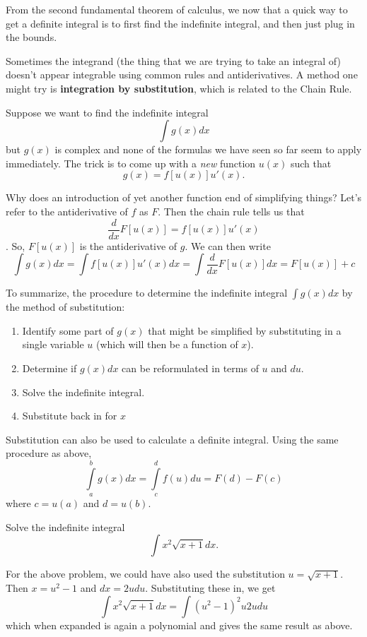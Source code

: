 \documentclass[]{book}
\providecommand{\tightlist}{%
  \setlength{\itemsep}{0pt}\setlength{\parskip}{0pt}}
\theoremstyle{definition}
\theoremstyle{definition}
\theoremstyle{definition}
\theoremstyle{remark}
\let\BeginKnitrBlock\begin \let\EndKnitrBlock\end
\begin{document}
From the second fundamental theorem of calculus, we now that a quick way
to get a definite integral is to first find the indefinite integral, and
then just plug in the bounds.

Sometimes the integrand (the thing that we are trying to take an
integral of) doesn't appear integrable using common rules and
antiderivatives. A method one might try is \textbf{integration by
substitution}, which is related to the Chain Rule.

Suppose we want to find the indefinite integral \[\int g(x)dx\] but
\(g(x)\) is complex and none of the formulas we have seen so far seem to
apply immediately. The trick is to come up with a \emph{new} function
\(u(x)\) such that \[g(x)=f[u(x)]u'(x).\]

Why does an introduction of yet another function end of simplifying
things? Let's refer to the antiderivative of \(f\) as \(F\). Then the
chain rule tells us that \[\frac{d}{dx} F[u(x)]=f[u(x)]u'(x)\]. So,
\(F[u(x)]\) is the antiderivative of \(g\). We can then write
\[\int g(x) dx= \int f[u(x)]u'(x)dx = \int \frac{d}{dx} F[u(x)]dx = F[u(x)]+c\]

To summarize, the procedure to determine the indefinite integral
\(\int g(x)dx\) by the method of substitution:

\begin{enumerate}
\def\labelenumi{\arabic{enumi}.}
\tightlist
\item
  Identify some part of \(g(x)\) that might be simplified by
  substituting in a single variable \(u\) (which will then be a function
  of \(x\)).
\item
  Determine if \(g(x)dx\) can be reformulated in terms of \(u\) and
  \(du\).
\item
  Solve the indefinite integral.
\item
  Substitute back in for \(x\)
\end{enumerate}

Substitution can also be used to calculate a definite integral. Using
the same procedure as above,
\[\int\limits_a^b g(x)dx=\int\limits_c^d f(u)du = F(d)-F(c)\] where
\(c=u(a)\) and \(d=u(b)\).

\BeginKnitrBlock{example}[Integration by Substitution I]
\protect\hypertarget{exm:intsub1}{}{\label{exm:intsub1}
{} } Solve the indefinite
integral \[\int x^2 \sqrt{x+1}dx.\]
\EndKnitrBlock{example}

For the above problem, we could have also used the substitution
\(u=\sqrt{x+1}\). Then \(x=u^2-1\) and \(dx=2u du\). Substituting these
in, we get \[\int x^2\sqrt{x+1}dx=\int (u^2-1)^2 u 2u du\] which when
expanded is again a polynomial and gives the same result as above.
\end{document}
